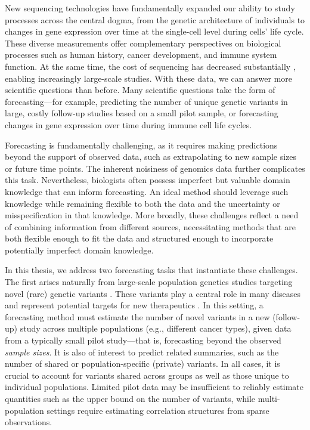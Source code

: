 New sequencing technologies have fundamentally expanded our ability to study processes across the central dogma, from the genetic architecture of individuals \citep{green2010draft, gravel2011demographic, tennessen2012evolution, lazaridis2014ancient, haak2015massive} to changes in gene expression over time at the single-cell level \citep{shapiro2013single, grun2015design} during cells' life cycle. These diverse measurements offer complementary perspectives on biological processes such as human history, cancer development, and immune system function. At the same time, the cost of sequencing has decreased substantially \citep{christensen2015assessing, park2016trends, schwarze2018whole, nawy2014single, ding2022temporal, potter2018single}, enabling increasingly large-scale studies. With these data, we can answer more scientific questions than before. Many scientific questions take the form of forecasting---for example, predicting the number of unique genetic variants in large, costly follow-up studies based on a small pilot sample, or forecasting changes in gene expression over time during immune cell life cycles.

Forecasting is fundamentally challenging, as it requires making predictions beyond the support of observed data, such as extrapolating to new sample sizes or future time points. The inherent noisiness of genomics data further complicates this task. Nevertheless, biologists often possess imperfect but valuable domain knowledge that can inform forecasting. An ideal method should leverage such knowledge while remaining flexible to both the data and the uncertainty or misspecification in that knowledge. More broadly, these challenges reflect a need of combining information from different sources, necessitating methods that are both flexible enough to fit the data and structured enough to incorporate potentially imperfect domain knowledge. 


In this thesis, we address two forecasting tasks that instantiate these challenges. The first arises naturally from large-scale population genetics studies targeting novel (rare) genetic variants \citep{lek2016analysis, karczewski2020mutational}. These variants play a central role in many diseases and represent potential targets for new therapeutics \citep{szustakowski2021advancing}. In this setting, a forecasting method must estimate the number of novel variants in a new (follow-up) study across multiple populations (e.g., different cancer types), given data from a typically small pilot study—that is, forecasting beyond the observed \textit{sample sizes}. It is also of interest to predict related summaries, such as the number of shared or population-specific (private) variants. In all cases, it is crucial to account for variants shared across groups as well as those unique to individual populations. Limited pilot data may be insufficient to reliably estimate quantities such as the upper bound on the number of variants, while multi-population settings require estimating correlation structures from sparse observations.

